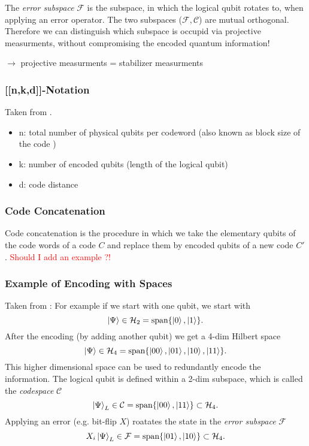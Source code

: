 The \textit{error subspace} $\mathcal{F}$ is the subspace, in which the logical qubit rotates to, when applying an error operator. 
The two subspaces ($\mathcal{F} , \mathcal{C}$) are mutual orthogonal. 
Therefore we can distinguish which subspace is occupid via projective measurments, 
without compromising the encoded quantum information!  \cite{QECintro}

$\rightarrow$ projective measurments = stabilizer measurments


\subsubsection{[[n,k,d]]-Notation}\label{sssec:nkd_notation}
Taken from \cite{QECintro}.
\begin{itemize}
    \item n: total number of physical qubits per codeword (also known as block size of the code \cite{QECmemory})
    \item k: number of encoded qubits (length of the logical qubit)
    \item d: code distance
\end{itemize}


\subsubsection{Code Concatenation}
Code concatenation is the procedure in which we take the elementary qubits of the code words of a code $C$ and replace them by encoded qubits of a new code $C'$. \cite{QECmemory}
\textcolor{red}{Should I add an example ?!}


\subsubsection{Example of Encoding with Spaces}
Taken from \cite{QECintro}: 
For example if we start with one qubit, we start with 
\begin{equation}
    \ket{\Psi} \in \mathcal{H}_2 = \text{span}\{\ket{0},\ket{1} \}.
\end{equation}
After the encoding (by adding another qubit) we get a 4-dim Hilbert space 
\begin{equation}
    \ket{\Psi} \in \mathcal{H}_4 = \text{span}\{\ket{00},\ket{01},\ket{10},\ket{11} \}.
\end{equation}
This higher dimensional space can be used to redundantly encode the information.
The logical qubit is defined within a 2-dim subspace, which is called the \textit{codespace} $\mathcal{C}$
\begin{equation}
    \ket{\Psi}_L \in \mathcal{C} = \text{span}\{\ket{00},\ket{11} \} \subset \mathcal{H}_4.
\end{equation}
Applying an error (e.g. bit-flip $X$) roatates the state in the \textit{error subspace} $\mathcal{F}$
\begin{equation}
    X_i \ket{\Psi}_L \in \mathcal{F} = \text{span}\{\ket{01},\ket{10} \} \subset \mathcal{H}_4.
\end{equation} 


